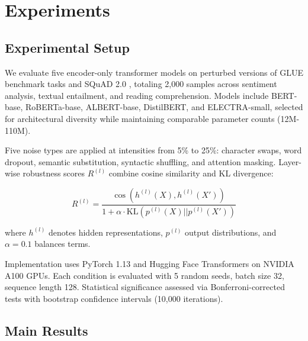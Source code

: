\section{Experiments}
\label{sec:experiments}

\subsection{Experimental Setup}

We evaluate five encoder-only transformer models on perturbed versions of GLUE benchmark tasks \cite{wang2018glue} and SQuAD 2.0 \cite{rajpurkar2018squad}, totaling 2,000 samples across sentiment analysis, textual entailment, and reading comprehension. Models include BERT-base, RoBERTa-base, ALBERT-base, DistilBERT, and ELECTRA-small, selected for architectural diversity while maintaining comparable parameter counts (12M-110M).

Five noise types are applied at intensities from 5\% to 25\%: character swaps, word dropout, semantic substitution, syntactic shuffling, and attention masking. Layer-wise robustness scores $R^{(l)}$ combine cosine similarity and KL divergence:

\begin{equation}
R^{(l)} = \frac{\cos(h^{(l)}(X), h^{(l)}(X'))}{1 + \alpha \cdot \text{KL}(p^{(l)}(X)||p^{(l)}(X'))}
\label{eq:robustness}
\end{equation}

where $h^{(l)}$ denotes hidden representations, $p^{(l)}$ output distributions, and $\alpha=0.1$ balances terms.

Implementation uses PyTorch 1.13 and Hugging Face Transformers on NVIDIA A100 GPUs. Each condition is evaluated with 5 random seeds, batch size 32, sequence length 128. Statistical significance assessed via Bonferroni-corrected tests with bootstrap confidence intervals (10,000 iterations).

\subsection{Main Results}

